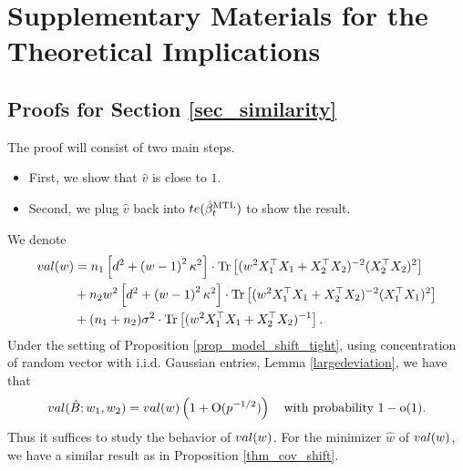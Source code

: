 \section{Supplementary Materials for the Theoretical Implications}

\subsection{Proofs for Section \ref{sec_similarity}}\label{app_proof_31}

The proof will consist of two main steps.
\begin{itemize}
	\item First, we show that $\hat{v}$ is close to $1$.
	\item Second, we plug $\hat{v}$ back into $te(\hat{\beta}_t^{\text{MTL}})$ to show the result.
\end{itemize}

We denote
\begin{align}
	val(w) &= n_1\left[d^2 +\left( w-1\right)^2\kappa^2\right]\cdot \operatorname{Tr}\left[( w^2X_1^{\top}X_1 +X_2^{\top}X_2)^{-2} (X_2^{\top}X_2)^2\right] \nonumber \\
	& + n_2w^2\left[d^2 +\left( w-1\right)^2\kappa^2\right]\cdot \operatorname{Tr}\left[( w^2X_1^{\top}X_1 +X_2^{\top}X_2)^{-2} (X_1^{\top}X_1)^2\right] \nonumber\\
			& + (n_1+n_2)\sigma^2 \cdot \operatorname{Tr}\left[(w^2X_1^{\top}X_1  + X_2^{\top}X_2)^{-1} \right]. \nonumber
\end{align}
Under the setting of Proposition \ref{prop_model_shift_tight}, using concentration of random vector with i.i.d. Gaussian entries, Lemma \ref{largedeviation}, we have that
$$val(\hat{B}; w_1, w_2)= val(w) \left( 1+\operatorname{O}(p^{-1/2})\right)\quad \text{with probability }1-\operatorname{o}(1).$$
Thus it suffices to study the behavior of $val (w)$.
For the minimizer $\hat w$ of $val(w)$, we have a similar result as in Proposition \ref{thm_cov_shift}.

